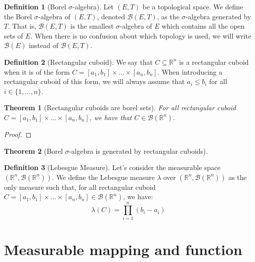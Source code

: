 \documentclass{article}
\newtheorem{theorem}{Theorem}[section]
\theoremstyle{definition}
\newtheorem{definition}{Definition}[section]
\theoremstyle{remark}
\theoremstyle{example}
\theoremstyle{notation}
\begin{document}
\begin{definition}[Borel $\sigma$-algebra]
		Let $(E, T)$ be a topological space. We define the Borel $\sigma$-algebra of $(E, T)$, denoted $\mathcal{B}(E, T)$, as the $\sigma$-algebra generated by $T$. That is, $\mathcal{B}(E, T)$ is the smallest $\sigma$-algebra of $E$ which contains all the open sets of $E$. When there is no confusion about which topology is used, we will write $\mathcal{B}(E)$ instead of $\mathcal{B}(E, T)$. 
\end{definition}

\begin{definition}[Rectangular cuboid]
	We say that $C \subseteq \mathbb{R}^n$ is a rectangular cuboid when it is of the form $C = [a_1, b_1] \times \dots \times [a_n, b_n]$. When introducing a rectangular cuboid of this form, we will always assume that $a_i \leq b_i$ for all $i \in \{1, \dots, n\}$.
\end{definition}

\begin{theorem}[Rectangular cuboids are borel sets]
	For all rectangular cuboid $C = [a_1, b_1] \times \dots \times [a_n, b_n]$, we have that $C \in \mathcal{B}(\mathbb{R}^n)$.
\end{theorem}

\begin{proof}
\end{proof}

\begin{theorem}[Borel $\sigma$-algebra is generated by rectangular cuboids]
\end{theorem}

\begin{definition}[Lebesgue Measure]
    Let's consider the measurable space $(\mathbb{R}^n, \mathcal{B}(\mathbb{R}^n))$. We define the Lebesgue measure $\lambda$ over $(\mathbb{R}^n, \mathcal{B}(\mathbb{R}^n))$ as the only measure such that, for all rectangular cuboid $C = [a_1, b_1] \times \dots \times [a_n, b_n] \in \mathcal{B}(\mathbb{R}^n)$, we have:
        $$\lambda(C) = \prod_{i=1}^n (b_i - a_i)$$
\end{definition}

\section{Measurable mapping and function}
\end{document}
